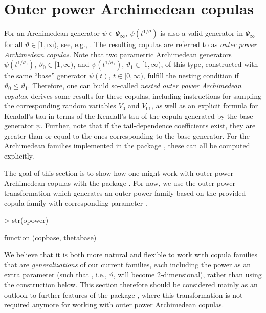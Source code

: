\documentclass[nojss,article]{jss}
\theoremstyle{mythmstyle}
\newcommand*{\vt}{\vartheta}
\newcommand*{\textcite}[2][]{\citet[#1]{#2}}
\begin{document}
\section{Outer power Archimedean copulas}
For an Archimedean generator $\psi\in\Psi_\infty$, $\psi(t^{1/\vt})$ is also a
valid generator in $\Psi_\infty$ for all $\vt\in[1,\infty)$, see, e.g.,
\textcite[p.\ 441]{feller1971}. The resulting copulas are
referred to as \textit{outer power Archimedean copulas}. Note that two
parametric Archimedean generators $\psi(t^{1/\vt_0})$, $\vt_0\in[1,\infty)$, and
$\psi(t^{1/\vt_1})$, $\vt_1\in[1,\infty)$, of this type, constructed with the
same ``base'' generator $\psi(t)$, $t\in[0,\infty)$, fulfill the nesting
condition if $\vt_0\le\vt_1$. Therefore, one can build so-called
\textit{nested outer power Archimedean copulas}.
\textcite{hofert2010a} derives some results for
these copulas, including instructions for sampling the corresponding random
variables $V_0$ and $V_{01}$, as well as an explicit formula for Kendall's tau
in terms of the Kendall's tau of the copula generated by the base generator
$\psi$. Further, note that if the tail-dependence coefficients exist, they are
greater than or equal to the ones corresponding to the base generator.
For the Archimedean families implemented in the package , these
can all be computed explicitly.

The goal of this section is to show how one might work with outer power
Archimedean copulas with the package .
For now, we use the outer power transformation 
which generates an outer power family based on the provided copula family
 with corresponding parameter .
\begin{Schunk}
\begin{Sinput}
> str(opower)
\end{Sinput}
\begin{Soutput}
function (copbase, thetabase)  
\end{Soutput}
\end{Schunk}
We believe that it is both more natural and flexible
to work with copula families that are \emph{generalizations} of our current
families, each including the power as an extra parameter (such that
, i.e., $\vartheta$, will become 2-dimensional), rather than
using the  construction below. This section therefore should be
considered mainly as an outlook to further features of the package
, where this transformation is not required anymore for working
with outer power Archimedean copulas.
\end{document}
